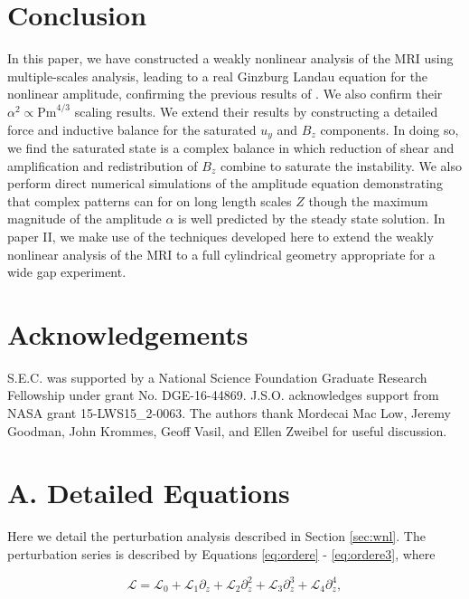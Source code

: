\documentclass{emulateapj}
\newcommand{\beq}{\begin{equation}}
\newcommand{\eeq}{\end{equation}}
\newcommand{\Pm}{\mathrm{Pm}}
\begin{document}
\section{Conclusion}
\label{sec:conclusion}

In this paper, we have constructed a weakly nonlinear analysis of the MRI using multiple-scales analysis, leading to a real Ginzburg Landau equation for the nonlinear amplitude, confirming the previous results of \citet{Umurhan:2007hs}. We also confirm their $\alpha^2 \propto \Pm^{4/3} $ scaling results. We extend their results by constructing a detailed force and inductive balance for the saturated $u_y$ and $B_z$ components. In doing so, we find the saturated state is a complex balance in which reduction of shear and amplification and redistribution of $B_z$ combine to saturate the instability. We also perform direct numerical simulations of the amplitude equation demonstrating that complex patterns can for on long length scales $Z$ though the maximum magnitude of the amplitude $\alpha$ is well predicted by the steady state solution. In paper II, we make use of the techniques developed here to extend the weakly nonlinear analysis of the MRI to a full cylindrical geometry appropriate for a wide gap experiment. 

\section{Acknowledgements}
S.E.C. was supported by a National Science Foundation Graduate Research Fellowship under grant No. DGE-16-44869. J.S.O. acknowledges support from NASA grant 15-LWS15\_2-0063. The authors thank Mordecai Mac Low, Jeremy Goodman, John Krommes, Geoff Vasil, and Ellen Zweibel for useful discussion.


\clearpage
\appendix

\section{A. Detailed Equations}\label{app:matrices}

Here we detail the perturbation analysis described in Section \ref{sec:wnl}. The perturbation series is described by Equations \ref{eq:ordere} - \ref{eq:ordere3}, where 

\beq
\mathcal{L} = \mathcal{L}_0 + \mathcal{L}_1 \partial_z + \mathcal{L}_2 \partial_z^2 + \mathcal{L}_3 \partial_z^3 + \mathcal{L}_4 \partial_z^4,
\eeq
\end{document}
